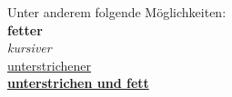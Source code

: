 \documentclass[a4paper, pdftex, 12pt, ngerman]{article}
\begin{document}
Unter anderem folgende Möglichkeiten:\\
\textbf{fetter}\\
\textit{kursiver}\\
\underline{unterstrichener}\\
\underline{\textbf{unterstrichen und fett}}\\
\end{document}
